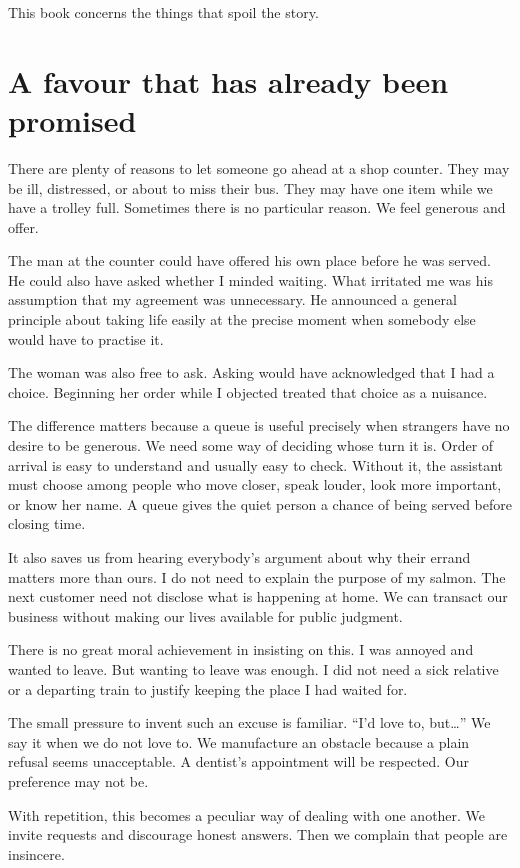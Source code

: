 \documentclass[12pt,a4paper]{book}
\begin{document}
This book concerns the things that spoil the story.

\section*{A favour that has already been promised}

There are plenty of reasons to let someone go ahead at a shop counter. They may be ill, distressed, or about to miss their bus. They may have one item while we have a trolley full. Sometimes there is no particular reason. We feel generous and offer.

The man at the counter could have offered his own place before he was served. He could also have asked whether I minded waiting. What irritated me was his assumption that my agreement was unnecessary. He announced a general principle about taking life easily at the precise moment when somebody else would have to practise it.

The woman was also free to ask. Asking would have acknowledged that I had a choice. Beginning her order while I objected treated that choice as a nuisance.

The difference matters because a queue is useful precisely when strangers have no desire to be generous. We need some way of deciding whose turn it is. Order of arrival is easy to understand and usually easy to check. Without it, the assistant must choose among people who move closer, speak louder, look more important, or know her name. A queue gives the quiet person a chance of being served before closing time.

It also saves us from hearing everybody's argument about why their errand matters more than ours. I do not need to explain the purpose of my salmon. The next customer need not disclose what is happening at home. We can transact our business without making our lives available for public judgment.

There is no great moral achievement in insisting on this. I was annoyed and wanted to leave. But wanting to leave was enough. I did not need a sick relative or a departing train to justify keeping the place I had waited for.

The small pressure to invent such an excuse is familiar. ``I'd love to, but\ldots{}'' We say it when we do not love to. We manufacture an obstacle because a plain refusal seems unacceptable. A dentist's appointment will be respected. Our preference may not be.

With repetition, this becomes a peculiar way of dealing with one another. We invite requests and discourage honest answers. Then we complain that people are insincere.
\end{document}
